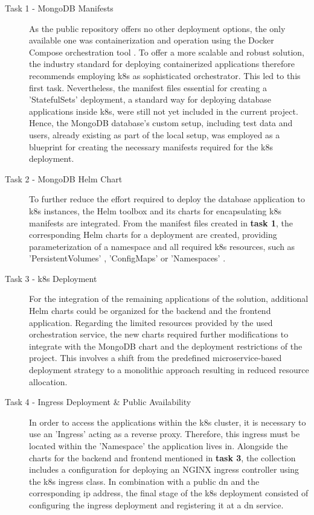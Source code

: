 \begin{description}
    \item[Task 1 - MongoDB Manifests] As the public repository offers no other deployment options, the only available one was containerization and operation using the Docker Compose orchestration tool \cite{noauthor_overview_2023}. 
    To offer a more scalable and robust solution, the industry standard for deploying containerized applications therefore recommends employing \acrshort{k8s} \cite{noauthor_produktionsreife_nodate} as sophisticated orchestrator. This led to this first task. 
    Nevertheless, the manifest files essential for creating a 'StatefulSets' \cite{noauthor_statefulsets_nodate} deployment, a standard way for deploying database applications inside \acrshort{k8s}, were still not yet included in the current project. 
    Hence, the MongoDB \cite{noauthor_mongodb_nodate} database's custom setup, including test data and users, already existing as part of the local setup, was employed as a blueprint for creating the necessary manifests required for the \acrshort{k8s} deployment.
    \item[Task 2 - MongoDB Helm Chart] To further reduce the effort required to deploy the database application to \acrshort{k8s} instances, the Helm \cite{noauthor_helm_nodate} toolbox and its charts for encapsulating \acrshort{k8s} manifests are integrated.  
    From the manifest files created in \textbf{task 1}, the corresponding Helm charts for a deployment are created, providing parameterization of a namespace and all required \acrshort{k8s} resources, such as 'PersistentVolumes' \cite{noauthor_persistent_nodate}, 'ConfigMaps' \cite{noauthor_configmaps_nodate} or 'Namespaces' \cite{noauthor_namespaces_nodate}. 
    \item[Task 3 - \acrshort{k8s} Deployment] For the integration of the remaining applications of the solution, additional Helm charts could be organized for the backend and the frontend application. 
    Regarding the limited resources provided by the used orchestration service, the new charts required further modifications to integrate with the MongoDB chart and the deployment restrictions of the project. This involves a shift from the predefined microservice-based deployment strategy to a monolithic approach resulting in reduced resource allocation.
    \item[Task 4 - Ingress Deployment \& Public Availability] In order to access the applications within the \acrshort{k8s} cluster, it is necessary to use an 'Ingress' \cite{noauthor_ingress_nodate} acting as a reverse proxy. 
    Therefore, this ingress must be located within the 'Namespace' the application lives in.
    Alongside the charts for the backend and frontend mentioned in \textbf{task 3}, the collection includes a configuration for deploying an NGINX ingress controller \cite{noauthor_nginx_nodate} using the \acrshort{k8s} ingress class. 
    In combination with a public \acrshort{dn} and the corresponding \acrshort{ip} address, the final stage of the \acrshort{k8s} deployment consisted of configuring the ingress deployment and registering it at a \acrshort{dn} service.
\end{description}

